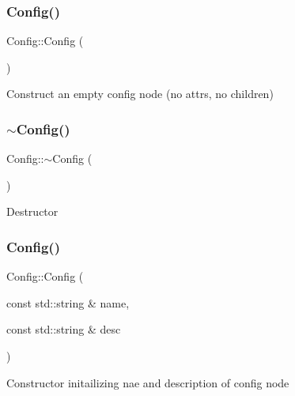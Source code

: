 \subsubsection{\texorpdfstring{Config()}{Config()}\hspace{0.1cm}{\footnotesize\ttfamily [1/2]}}
{\footnotesize\ttfamily Config\+::\+Config (\begin{DoxyParamCaption}{ }\end{DoxyParamCaption})}

Construct an empty config node (no attrs, no children) \mbox{\label{classtheoria_1_1config_1_1Config_a543dce59b66475c5108088ee4ce1cdfc}} 
\subsubsection{\texorpdfstring{$\sim$\+Config()}{~Config()}}
{\footnotesize\ttfamily Config\+::$\sim$\+Config (\begin{DoxyParamCaption}{ }\end{DoxyParamCaption})\hspace{0.3cm}{\ttfamily [virtual]}}

Destructor \mbox{\label{classtheoria_1_1config_1_1Config_a232146edc23baa804dbc82ffd3158f49}} 
\subsubsection{\texorpdfstring{Config()}{Config()}\hspace{0.1cm}{\footnotesize\ttfamily [2/2]}}
{\footnotesize\ttfamily Config\+::\+Config (\begin{DoxyParamCaption}\item[{const std\+::string \&}]{name,  }\item[{const std\+::string \&}]{desc }\end{DoxyParamCaption})\hspace{0.3cm}{\ttfamily [protected]}}

Constructor initailizing nae and description of config node 

